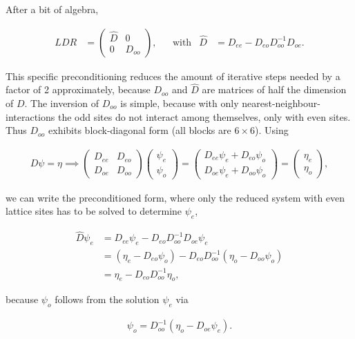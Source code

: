 \documentclass{article}
\theoremstyle{plain} %
\theoremstyle{convention} %
\theoremstyle{remark} %
\numberwithin{equation}{section}
\begin{document}
After a bit of algebra,

\begin{align*}
    L D R &= 
        \begin{pmatrix}
        \hat{D} & 0 \\
        0 & D_{oo}
        \end{pmatrix},
    & &\text{with} &
    \hat{D} &= D_{ee} - D_{eo} D_{oo}^{-1} D_{oe}.
\end{align*}

This specific preconditioning reduces the amount of iterative steps needed by a factor of \num{2} approximately, because $D_{oo}$ and $\hat{D}$ are matrices of half the dimension of $D$. The inversion of $D_{oo}$ is simple, because with only nearest-neighbour-interactions the odd sites do not interact among themselves, only with even sites. Thus $D_{oo}$ exhibits block-diagonal form (all blocks are $6 \times 6$). Using

\begin{align*}
    D \psi = \eta \implies \begin{pmatrix}
    D_{ee} & D_{eo} \\
    D_{oe} & D_{oo}
    \end{pmatrix} \begin{pmatrix} \psi_e \\ \psi_o \end{pmatrix} = \begin{pmatrix} D_{ee} \psi_e + D_{eo} \psi_o \\ D_{oe}\psi_e + D_{oo} \psi_o \end{pmatrix} = \begin{pmatrix} \eta_e \\ \eta_o \end{pmatrix},
\end{align*}

we can write the preconditioned form, where only the reduced system with even lattice sites has to be solved to determine $\psi_e$,

\begin{align*}
    \hat{D} \psi_e &= D_{ee} \psi_e - D_{eo} D_{oo}^{-1} D_{oe} \psi_e \\
    &= ( \eta_e - D_{eo} \psi_o ) - D_{eo} D_{oo}^{-1} ( \eta_o - D_{oo} \psi_o ) \\
    &= \eta_e - D_{eo} D_{oo}^{-1} \eta_o,
\end{align*}

because $\psi_o$ follows from the solution $\psi_e$ via

\begin{align*}
    \psi_o = D_{oo}^{-1} (\eta_o - D_{oe} \psi_e).
\end{align*}
\end{document}

